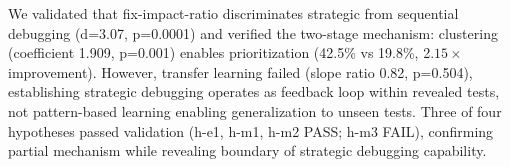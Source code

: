 We validated that fix-impact-ratio discriminates strategic from sequential debugging (d=3.07, p=0.0001) and verified the two-stage mechanism: clustering (coefficient 1.909, p=0.001) enables prioritization (42.5\% vs 19.8\%, 2.$15\times$ improvement). However, transfer learning failed (slope ratio 0.82, p=0.504), establishing strategic debugging operates as feedback loop within revealed tests, not pattern-based learning enabling generalization to unseen tests. Three of four hypotheses passed validation (h-e1, h-m1, h-m2 PASS; h-m3 FAIL), confirming partial mechanism while revealing boundary of strategic debugging capability.
